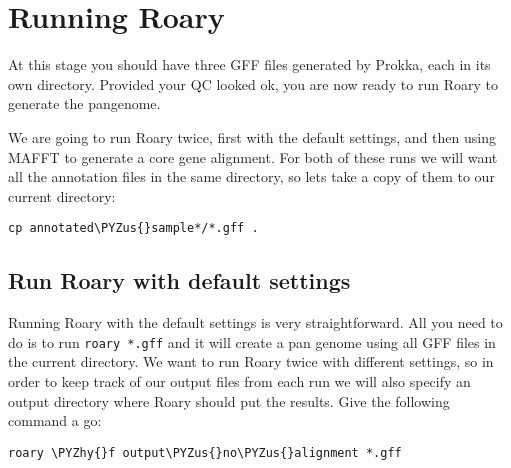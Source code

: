 \documentclass[11pt]{article}
\makeatletter
\def\PYZus{\char`\_}
\def\PYZhy{\char`\-}
\newcommand{\boxspacing}{\kern\kvtcb@left@rule\kern\kvtcb@boxsep}
\newcommand{\prompt}[4]{
         {\ttfamily\llap{{\color{blue}\LARGE\faKeyboardO\hspace{3pt}#4}}\vspace{-\baselineskip}}
    }
\makeatother
\begin{document}
    \hypertarget{running-roary}{%
\section{Running Roary}\label{running-roary}}

At this stage you should have three GFF files generated by Prokka, each
in its own directory. Provided your QC looked ok, you are now ready to
run Roary to generate the pangenome.

We are going to run Roary twice, first with the default settings, and
then using MAFFT to generate a core gene alignment. For both of these
runs we will want all the annotation files in the same directory, so
lets take a copy of them to our current directory:

    \begin{tcolorbox}[breakable, size=fbox, boxrule=1pt, pad at break*=1mm,colback=cellbackground, colframe=cellborder]
\prompt{In}{incolor}{ }{\boxspacing}
\begin{Verbatim}[commandchars=\\\{\}]
cp annotated\PYZus{}sample*/*.gff .
\end{Verbatim}
\end{tcolorbox}

    \hypertarget{run-roary-with-default-settings}{%
\subsection{Run Roary with default
settings}\label{run-roary-with-default-settings}}

Running Roary with the default settings is very straightforward. All you
need to do is to run \texttt{roary\ *.gff} and it will create a pan
genome using all GFF files in the current directory. We want to run
Roary twice with different settings, so in order to keep track of our
output files from each run we will also specify an output directory
where Roary should put the results. Give the following command a go:

    \begin{tcolorbox}[breakable, size=fbox, boxrule=1pt, pad at break*=1mm,colback=cellbackground, colframe=cellborder]
\prompt{In}{incolor}{ }{\boxspacing}
\begin{Verbatim}[commandchars=\\\{\}]
roary \PYZhy{}f output\PYZus{}no\PYZus{}alignment *.gff
\end{Verbatim}
\end{tcolorbox}
\end{document}
